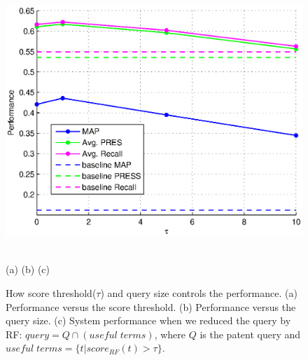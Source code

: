\documentclass{sig-alternate}
\begin{document}
\begin{figure}[htpb]
\begin{center}
\begin{minipage}[b]{0.3\linewidth}
\end{minipage}
\hfill
\begin{minipage}[b]{0.3\linewidth}
\includegraphics[width=\linewidth]{figs/opt-patentquery-tau.eps}
\end{minipage}
\vspace{-0.5mm}\\
 \hspace{2mm}(a) \hspace{55mm}(b) \hspace{58mm} (c)
\caption{\footnotesize
How score threshold($\tau$) and query size controls the performance.
(a) Performance versus the score threshold. (b) Performance versus the query size. (c) System performance when we reduced the query by RF: $ query = Q\cap (useful \; terms) $, where $ Q $ is the patent query and $ useful\; terms = \{t| score_{RF}(t)>\tau\} $.}
\vspace{-4mm}
\end{center}
\label{fig:control}
\end{figure}
\end{document}
